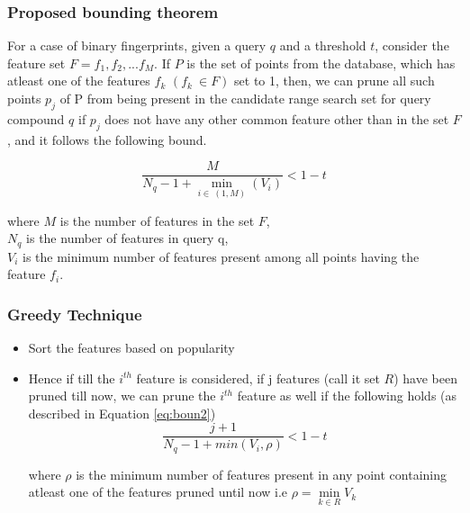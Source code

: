 \documentclass{beamer}
\begin{document}
\begin{frame}
\frametitle{Proposed bounding theorem}
\begin{theorem}
\label{thm2bound}
For a case of binary fingerprints, given a query $q$ and a threshold $t$, consider the feature set $F=f_1, f_2,...f_M$. If $P$ is the set of points from the database, which has atleast one of the features $f_k$  $(f_k~\in F)$ set to 1, then, we can prune all such points $p_j$ of P from being present in the candidate range search set for query compound $q$ if $p_j$ does not have any other common feature other than in the set $F$, and it follows the following bound. 

\begin{equation}
\label{eq:boun2}
\frac{M}{N_q - 1 + \min\limits_{i\in~(1,M)}(V_i) } < 1-t 
\end{equation}

where $M$ is the number of features in the set $F$,\\ $N_q$ is the number of features in query q,\\$V_{i}$ is the minimum number of features present among all points having the feature $f_i$.





\end{theorem}
\end{frame}

\begin{frame}
\frametitle{Greedy Technique}

\begin{itemize}
	\item<1-> Sort the features based on popularity
	\item<2-> Hence if till the $i^{th}$ feature is considered, if j features (call it set $R$) have been pruned till now, we can prune the $i^{th}$ feature as well if the following holds (as described in Equation \autoref{eq:boun2})
	\begin{equation}
	\label{eq: greedy}
	\frac{j+1}{N_q - 1 + min(V_{i}, \rho)} < 1-t 
	\end{equation}
	
where 	$\rho$ is the minimum  number of features present in any point containing atleast one of the features pruned until now i.e $\rho = \min\limits_{k\in R} V_k$ 

\end{itemize}
\end{frame}
\end{document}
